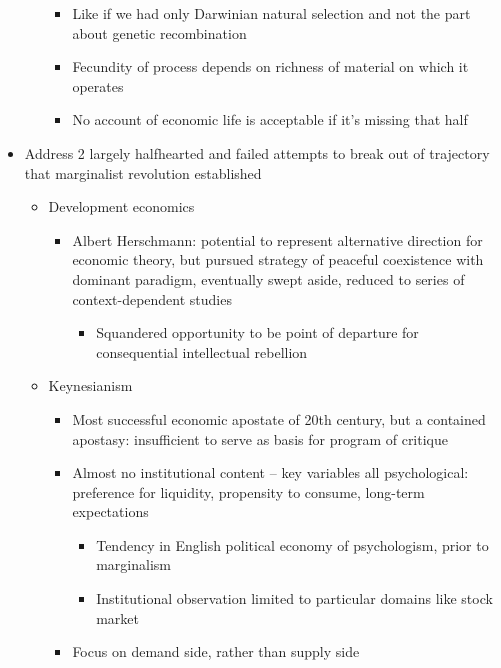 \begin{itemize}
\begin{itemize}
    \begin{itemize}
    \tightlist
    \item
      Like if we had only Darwinian natural selection and not the part
      about genetic recombination
    \item
      Fecundity of process depends on richness of material on which it
      operates
    \item
      No account of economic life is acceptable if it's missing that
      half
    \end{itemize}
  \end{itemize}
\item
  Address 2 largely halfhearted and failed attempts to break out of
  trajectory that marginalist revolution established

  \begin{itemize}
  \tightlist
  \item
    Development economics

    \begin{itemize}
    \tightlist
    \item
      Albert Herschmann: potential to represent alternative direction
      for economic theory, but pursued strategy of peaceful coexistence
      with dominant paradigm, eventually swept aside, reduced to series
      of context-dependent studies

      \begin{itemize}
      \tightlist
      \item
        Squandered opportunity to be point of departure for
        consequential intellectual rebellion
      \end{itemize}
    \end{itemize}
  \item
    Keynesianism

    \begin{itemize}
    \tightlist
    \item
      Most successful economic apostate of 20th century, but a contained
      apostasy: insufficient to serve as basis for program of critique
    \item
      Almost no institutional content -- key variables all
      psychological: preference for liquidity, propensity to consume,
      long-term expectations

      \begin{itemize}
      \tightlist
      \item
        Tendency in English political economy of psychologism, prior to
        marginalism
      \item
        Institutional observation limited to particular domains like
        stock market
      \end{itemize}
    \item
      Focus on demand side, rather than supply side


\end{itemize}
\end{itemize}
\end{itemize}
